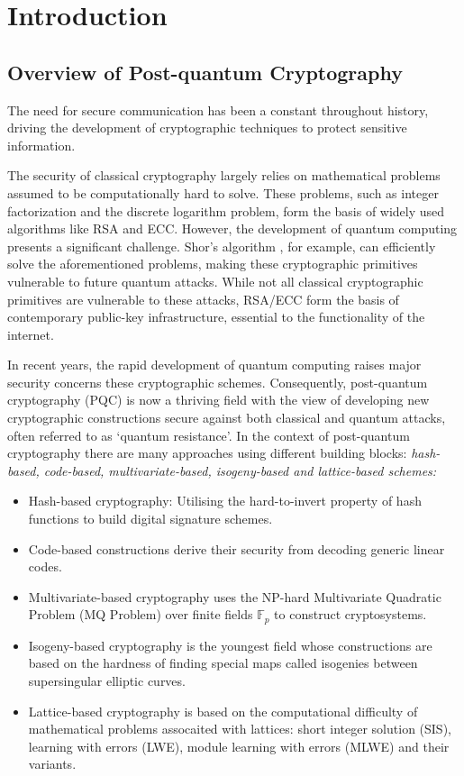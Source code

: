 \section{Introduction} \label{introduction}
\subsection{Overview of Post-quantum Cryptography}

The need for secure communication has been a constant throughout history, driving the development of cryptographic techniques to protect sensitive information. 

The security of classical cryptography largely relies on mathematical problems assumed to be computationally hard to solve. These problems, such as integer factorization and the discrete logarithm problem, form the basis of widely used algorithms like RSA and ECC. However, the development of quantum computing presents a significant challenge. Shor's algorithm \cite{}, for example, can efficiently solve the aforementioned problems, making these cryptographic primitives vulnerable to future quantum attacks. While not all classical cryptographic primitives are vulnerable to these attacks, RSA/ECC form the basis of contemporary public-key infrastructure, essential to the functionality of the internet.

In recent years, the rapid development of quantum computing raises major security concerns these cryptographic schemes. Consequently, post-quantum cryptography (PQC) is now a thriving field with the view of developing new cryptographic constructions secure against both classical and quantum attacks, often referred to as `quantum resistance'. In the context of post-quantum cryptography there are many approaches using different building blocks: \textit{hash-based, code-based, multivariate-based, isogeny-based and lattice-based schemes:}
\begin{itemize}
    \item Hash-based cryptography: Utilising the hard-to-invert property of hash functions to build digital signature schemes.
    \item Code-based constructions derive their security from decoding generic linear codes.
    \item Multivariate-based cryptography uses the NP-hard Multivariate Quadratic Problem (MQ Problem) over finite fields $\mathbb{F}_p$ to construct cryptosystems.
    \item Isogeny-based cryptography is the youngest field whose constructions are based on the hardness of finding special maps called isogenies between supersingular elliptic curves.
    \item Lattice-based cryptography is based on the computational difficulty of mathematical problems assocaited with lattices: short integer solution (SIS), learning with errors (LWE), module learning with errors (MLWE) and their variants.
\end{itemize}

